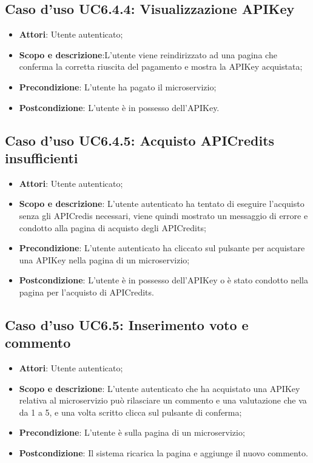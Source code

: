 \documentclass[12pt,a4paper,titlepage]{article}
\begin{document}
	\subsection{Caso d'uso UC6.4.4: Visualizzazione APIKey}
	\label{UC6.4.4}
	\begin{itemize}
		\item \textbf{Attori}: Utente autenticato;
		\item \textbf{Scopo e descrizione}:L'utente viene reindirizzato ad una pagina che conferma la corretta riuscita del pagamento e mostra la APIKey acquistata;
		\item \textbf{Precondizione}: L'utente ha pagato il microservizio;
		\item \textbf{Postcondizione}: L'utente è in possesso dell'APIKey.
	\end{itemize}
	\subsection{Caso d'uso UC6.4.5: Acquisto APICredits insufficienti}
	\label{UC6.4.5}
	\begin{itemize}
		\item \textbf{Attori}: Utente autenticato;
		\item \textbf{Scopo e descrizione}: L'utente autenticato ha tentato di eseguire l'acquisto senza gli APICredis necessari, viene quindi mostrato un messaggio di errore e condotto alla pagina di acquisto degli APICredits;
		\item \textbf{Precondizione}: L'utente autenticato ha cliccato sul pulsante per acquistare una APIKey nella pagina di un microservizio;
		\item \textbf{Postcondizione}: L'utente è in possesso dell'APIKey o è stato condotto nella pagina per l'acquisto di APICredits.
	\end{itemize}
	\subsection{Caso d'uso UC6.5: Inserimento voto e commento}
	\label{UC6.5}
	\begin{itemize}
		\item \textbf{Attori}: Utente autenticato;
		\item \textbf{Scopo e descrizione}: L'utente autenticato che ha acquistato una APIKey relativa al microservizio può rilasciare un commento e una valutazione che va da 1 a 5, e una volta scritto clicca sul pulsante di conferma;
		\item \textbf{Precondizione}: L'utente è sulla pagina di un microservizio;
		\item \textbf{Postcondizione}: Il sistema ricarica la pagina e aggiunge il nuovo commento.
	\end{itemize}
\end{document}
